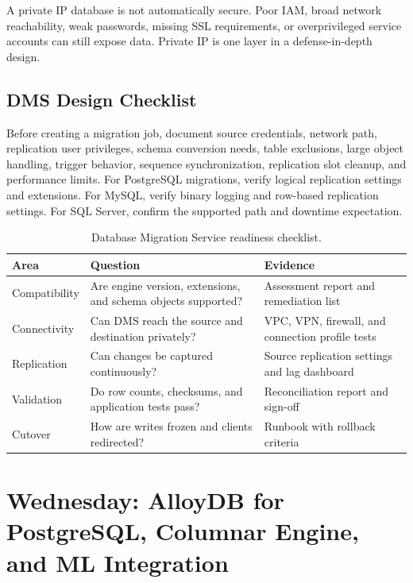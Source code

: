 \begin{pitfall}
A private IP database is not automatically secure. Poor IAM, broad network reachability, weak passwords, missing SSL requirements, or overprivileged service accounts can still expose data. Private IP is one layer in a defense-in-depth design.
\end{pitfall}

\subsection{DMS Design Checklist}
Before creating a migration job, document source credentials, network path, replication user privileges, schema conversion needs, table exclusions, large object handling, trigger behavior, sequence synchronization, replication slot cleanup, and performance limits. For PostgreSQL migrations, verify logical replication settings and extensions. For MySQL, verify binary logging and row-based replication settings. For SQL Server, confirm the supported path and downtime expectation.

\begin{table}[H]
\centering
\small
\begin{tabular}{@{}p{3.0cm}p{4.6cm}p{4.8cm}@{}}
\toprule
\textbf{Area} & \textbf{Question} & \textbf{Evidence} \\
\midrule
Compatibility & Are engine version, extensions, and schema objects supported? & Assessment report and remediation list \\
Connectivity & Can DMS reach the source and destination privately? & VPC, VPN, firewall, and connection profile tests \\
Replication & Can changes be captured continuously? & Source replication settings and lag dashboard \\
Validation & Do row counts, checksums, and application tests pass? & Reconciliation report and sign-off \\
Cutover & How are writes frozen and clients redirected? & Runbook with rollback criteria \\
\bottomrule
\end{tabular}
\caption{Database Migration Service readiness checklist.}
\label{tab:dms-readiness}
\end{table}

\section{Wednesday: AlloyDB for PostgreSQL, Columnar Engine, and ML Integration}

